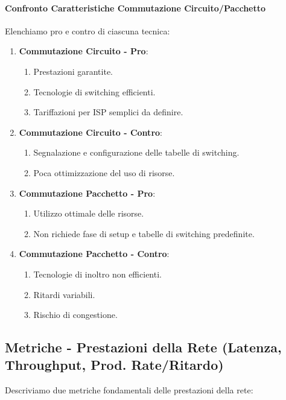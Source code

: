 \documentclass{article}
\begin{document}
\paragraph{Confronto Caratteristiche Commutazione Circuito/Pacchetto} Elenchiamo pro e contro di ciascuna tecnica:

\begin{enumerate}
    \item \textbf{Commutazione Circuito - Pro}:
    \begin{enumerate}
        \item Prestazioni garantite.
        \item Tecnologie di switching efficienti.
        \item Tariffazioni per ISP semplici da definire.
    \end{enumerate}
    \item \textbf{Commutazione Circuito - Contro}:
    \begin{enumerate}
        \item Segnalazione e configurazione delle tabelle di switching.
        \item Poca ottimizzazione del uso di risorse.
    \end{enumerate}
    \newpage
    \item \textbf{Commutazione Pacchetto - Pro}:
    \begin{enumerate}
        \item Utilizzo ottimale delle risorse.
        \item Non richiede fase di setup e tabelle di switching predefinite.
    \end{enumerate}
    \item \textbf{Commutazione Pacchetto - Contro}:
    \begin{enumerate}
        \item Tecnologie di inoltro non efficienti.
        \item Ritardi variabili.
        \item Rischio di congestione.
    \end{enumerate}

\end{enumerate}

\subsection{Metriche - Prestazioni della Rete (Latenza, Throughput, Prod. Rate/Ritardo)}

Descriviamo due metriche fondamentali delle prestazioni della rete:
\end{document}

